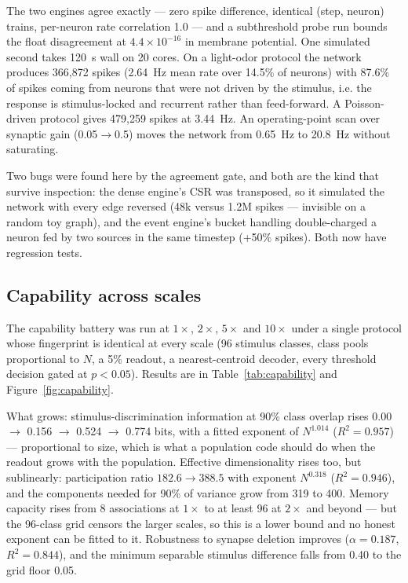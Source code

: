 \documentclass[11pt,a4paper]{article}
\begin{document}
The two engines agree exactly --- zero spike difference, identical (step, neuron) trains,
per-neuron rate correlation 1.0 --- and a subthreshold probe run bounds the float disagreement at
$4.4\times10^{-16}$ in membrane potential. One simulated second takes 120~s wall on 20 cores. On
a light-odor protocol the network produces 366{,}872 spikes (2.64~Hz mean rate over 14.5\% of
neurons) with 87.6\% of spikes coming from neurons that were not driven by the
stimulus, i.e. the response is stimulus-locked and recurrent rather than feed-forward. A
Poisson-driven protocol gives 479{,}259 spikes at 3.44~Hz. An operating-point scan over synaptic
gain (0.05$\to$0.5) moves the network from 0.65~Hz to 20.8~Hz without saturating.

Two bugs were found here by the agreement gate, and both are the kind that survive inspection: the
dense engine's CSR was transposed, so it simulated the network with every edge reversed (48k
versus 1.2M spikes --- invisible on a random toy graph), and the event engine's bucket handling
double-charged a neuron fed by two sources in the same timestep (+50\% spikes). Both now have
regression tests.

\subsection{Capability across scales}
\label{sec:capability-battery}
The capability battery was run at $1\times$, $2\times$, $5\times$ and $10\times$ under a single
protocol whose fingerprint is identical at every scale (96 stimulus classes, class pools
proportional to $N$, a 5\% readout, a nearest-centroid decoder, every threshold decision gated at
$p<0.05$). Results are in Table~\ref{tab:capability} and Figure~\ref{fig:capability}.

\begin{table}[t]
\centering
\caption{Capability across scales. Discrimination information and effective dimensionality grow;
memory capacity saturates at the test grid's ceiling from $2\times$ up (a lower bound, starred);
temporal depth and sequence depth never exceed chance at any scale. All values are measured; the
grid ceiling is the measurement's limit, not the system's.}
\label{tab:capability}

\end{table}

What grows: stimulus-discrimination information at 90\% class overlap rises 0.00
$\to$ 0.156 $\to$ 0.524 $\to$ 0.774 bits, with a fitted exponent of $N^{1.014}$ ($R^2=0.957$) ---
proportional to size, which is what a population code should do when the readout grows with the
population. Effective dimensionality rises too, but sublinearly: participation ratio $182.6 \to
388.5$ with exponent $N^{0.318}$ ($R^2=0.946$), and the components needed for 90\% of variance
grow from 319 to 400. Memory capacity rises from 8 associations at $1\times$ to at least 96 at
$2\times$ and beyond --- but the 96-class grid censors the larger scales, so this is a lower
bound and no honest exponent can be fitted to it. Robustness to synapse deletion improves
($\alpha = 0.187$, $R^2=0.844$), and the minimum separable stimulus difference falls from 0.40 to
the grid floor 0.05.
\end{document}
